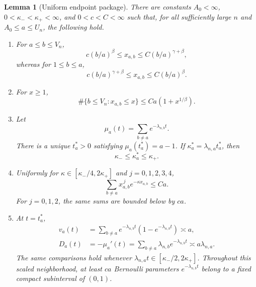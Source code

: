 \documentclass[11pt]{article}
\newtheorem{lemma}[theorem]{Lemma}
\theoremstyle{remark}
\begin{document}
\begin{lemma}[Uniform endpoint package]\label{lem:global-endpoint-package}
There are constants $A_0<\infty$,
$0<\kappa_-<\kappa_+<\infty$, and $0<c<C<\infty$ such that, for all
sufficiently large $n$ and $A_0\le a\le U_n$, the following hold.

\begin{enumerate}[label=(\roman*)]
\item For $a\le b\le V_n$,
\[
        c(b/a)^\beta\le x_{a,b}
        \le C(b/a)^{\gamma+\beta},
\]
whereas for $1\le b\le a$,
\[
        c(b/a)^{\gamma+\beta}\le x_{a,b}
        \le C(b/a)^\beta.
\]

\item For $x\ge1$,
\[
        \#\{b\le V_n:x_{a,b}\le x\}
        \le Ca(1+x^{1/\beta}).
\]

\item Let
\[
        \mu_a(t)=\sum_{b\ne a}e^{-\lambda_{n,b}t}.
\]
There is a unique $t_a^*>0$ satisfying $\mu_a(t_a^*)=a-1$.  If
$\kappa_a^*=\lambda_{n,a}t_a^*$, then
\[
        \kappa_-\le\kappa_a^*\le\kappa_+.
\]

\item Uniformly for
$\kappa\in[\kappa_-/4,2\kappa_+]$ and $j=0,1,2,3,4$,
\[
        \sum_{b\ne a}x_{a,b}^{\,j}e^{-\kappa x_{a,b}}\le Ca.
\]
For $j=0,1,2$, the same sums are bounded below by $ca$.

\item At $t=t_a^*$,
\[
\begin{aligned}
        v_a(t)&=\sum_{b\ne a}e^{-\lambda_{n,b}t}
        (1-e^{-\lambda_{n,b}t})\asymp a,\\
        D_a(t)&=-\mu_a'(t)
        =\sum_{b\ne a}\lambda_{n,b}e^{-\lambda_{n,b}t}
        \asymp a\lambda_{n,a}.
\end{aligned}
\]
The same comparisons hold whenever
$\lambda_{n,a}t\in[\kappa_-/2,2\kappa_+]$.  Throughout this scaled
neighborhood, at least $ca$ Bernoulli parameters
$e^{-\lambda_{n,b}t}$ belong to a fixed compact subinterval of $(0,1)$.
\end{enumerate}
\end{lemma}
\end{document}
